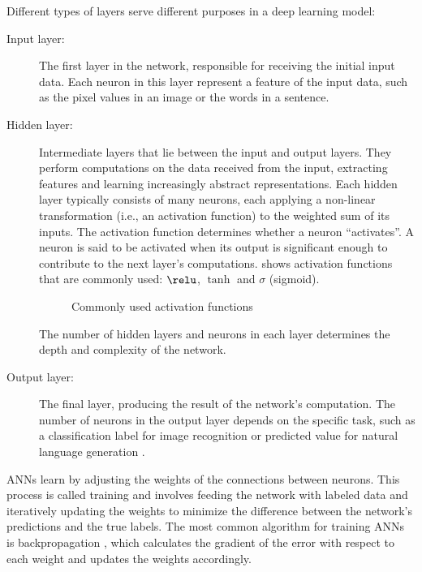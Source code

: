 Different types of layers serve different purposes in a deep learning model:
\begin{description}
    \item[Input layer:] 
    The first layer in the network, responsible for receiving the initial input data.
    Each neuron in this layer represent a feature of the input data, such as the pixel values in an image or the words in a sentence.
    \item[Hidden layer:] 
    Intermediate layers that lie between the input and output layers.
    They perform computations on the data received from the input, extracting features and learning increasingly abstract representations.
    Each hidden layer typically consists of many neurons, each applying a non-linear transformation (i.e., an activation function) to the weighted sum of its inputs.
    The activation function determines whether a neuron ``activates''.
    A neuron is said to be activated when its output is significant enough to contribute to the next layer's computations.
     shows activation functions that are commonly used: $\relu$, $\tanh$ and $\sigma$ (sigmoid).

    \begin{figure}[hbtp]
        \centering    
        
        \caption{Commonly used activation functions}
        \label{fig:activation_functions}
    \end{figure} 


    The number of hidden layers and neurons in each layer determines the depth and complexity of the network.
    \item[Output layer:] 
    The final layer, producing the result of the network's computation.
    The number of neurons in the output layer depends on the specific task, such as a classification label for image recognition or predicted value for natural language generation \cite{goodfellowDeepLearning2016}.
\end{description}

ANNs learn by adjusting the weights of the connections between neurons.
This process is called training and involves feeding the network with labeled data and iteratively updating the weights to minimize the difference between the network's predictions and the true labels.
The most common algorithm for training ANNs is backpropagation \cite{rumelhartLearningRepresentationsBackpropagating1986}, which calculates the gradient of the error with respect to each weight and updates the weights accordingly.

